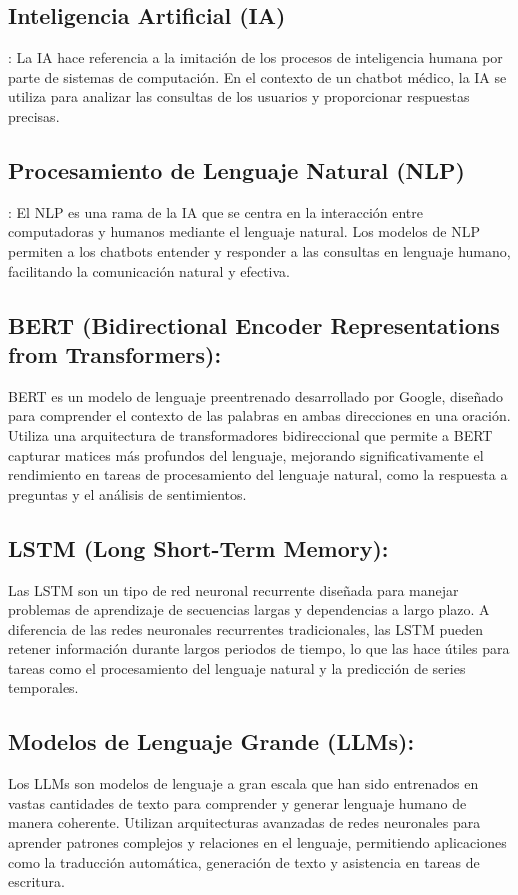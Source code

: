 \subsection{Inteligencia Artificial (IA)}: La IA hace referencia a la imitación de los procesos de inteligencia humana por parte de sistemas de computación. En el contexto de un chatbot médico, la IA se utiliza para analizar las consultas de los usuarios y proporcionar respuestas precisas.

\subsection{Procesamiento de Lenguaje Natural (NLP)}: El NLP es una rama de la IA que se centra en la interacción entre computadoras y humanos mediante el lenguaje natural. Los modelos de NLP permiten a los chatbots entender y responder a las consultas en lenguaje humano, facilitando la comunicación natural y efectiva.

\subsection{BERT (Bidirectional Encoder Representations from Transformers):} BERT es un modelo de lenguaje preentrenado desarrollado por Google, diseñado para comprender el contexto de las palabras en ambas direcciones en una oración. Utiliza una arquitectura de transformadores bidireccional que permite a BERT capturar matices más profundos del lenguaje, mejorando significativamente el rendimiento en tareas de procesamiento del lenguaje natural, como la respuesta a preguntas y el análisis de sentimientos.

\subsection{LSTM (Long Short-Term Memory):} Las LSTM son un tipo de red neuronal recurrente diseñada para manejar problemas de aprendizaje de secuencias largas y dependencias a largo plazo. A diferencia de las redes neuronales recurrentes tradicionales, las LSTM pueden retener información durante largos periodos de tiempo, lo que las hace útiles para tareas como el procesamiento del lenguaje natural y la predicción de series temporales.

\subsection{Modelos de Lenguaje Grande (LLMs):} Los LLMs son modelos de lenguaje a gran escala que han sido entrenados en vastas cantidades de texto para comprender y generar lenguaje humano de manera coherente. Utilizan arquitecturas avanzadas de redes neuronales para aprender patrones complejos y relaciones en el lenguaje, permitiendo aplicaciones como la traducción automática, generación de texto y asistencia en tareas de escritura.


